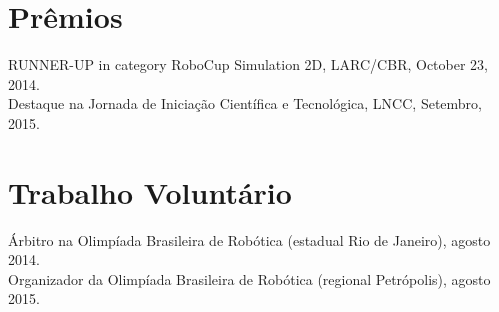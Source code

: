 \documentclass[margin, 10pt]{res} %
\begin{document}
\begin{resume}

\section{Prêmios} 
RUNNER-UP in category RoboCup Simulation 2D, LARC/CBR, October 23, 2014.\\
Destaque na Jornada de Iniciação Científica e Tecnológica, LNCC, Setembro, 2015.



\section{Trabalho Voluntário}
Árbitro na Olimpíada Brasileira de Robótica (estadual Rio de Janeiro), agosto 2014.\\
Organizador da Olimpíada Brasileira de Robótica (regional Petrópolis), agosto 2015.


\end{resume}
\end{document}
